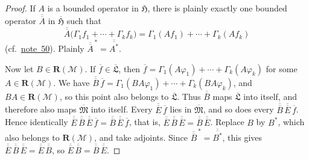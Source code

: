 \documentclass[
  paper=b5,
  twoside=true,
  fontsize=13pt,
  headings=normal,
  bookmarkpackage=false
]{scrartcl}
\theoremstyle{definition}
\newcommand{\NoteRef}[1]{\hyperref[fn:#1]{note~#1}}
\newcommand{\GeneratedRing}{\boldsymbol{R}}
\newcommand{\FrakM}{\mathfrak{M}}
\newcommand{\FrakL}{\mathfrak{L}}
\begin{document}
\begin{proof}
If \(A\) is a bounded operator in \(\mathfrak H\), there is plainly
exactly one bounded operator \(\overline{\overline A}\) in
\(\overline{\mathfrak H}\) such that
\[
  \overline{\overline A}\bigl(\Gamma_1f_1+\cdots+\Gamma_kf_k\bigr)
  =\Gamma_1(Af_1)+\cdots+\Gamma_k(Af_k)
\]
(cf.\ \NoteRef{50}). Plainly
\(\overline{\overline A}^{\,*}=\overline{\overline{A^*}}\).

Now let \(B\in \GeneratedRing (\mathcal M)\). If \(\overline f\in\overline{\FrakL}\),
then \(\overline f=\Gamma_1(A\varphi_1)+\cdots+\Gamma_k(A\varphi_k)\)
for some \(A\in \GeneratedRing (\mathcal M)\). We have
\(\overline{\overline B}\,\overline f
 =\Gamma_1(BA\varphi_1)+\cdots+\Gamma_k(BA\varphi_k)\), and
\(BA\in \GeneratedRing (\mathcal M)\), so this point also belongs to \(\overline{\FrakL}\).
Thus \(\overline{\overline B}\) maps \(\overline{\FrakL}\) into itself,
and therefore also maps \(\overline{\FrakM}\) into itself.
Every \(\overline{\overline E}\,\overline f\) lies in \(\overline{\FrakM}\),
and so does every \(\overline{\overline B}\,\overline{\overline E}\,\overline f\).
Hence identically
\(\overline{\overline E}\,\overline{\overline B}\,\overline{\overline E}\,\overline f
 =\overline{\overline B}\,\overline{\overline E}\,\overline f\), that is,
\(\overline{\overline E}\,\overline{\overline B}\,\overline{\overline E}
 =\overline{\overline B}\,\overline{\overline E}\).
Replace \(B\) by \(B^*\), which also belongs to \(\GeneratedRing (\mathcal M)\), and
take adjoints. Since
\(\overline{\overline B}^{\,*}=\overline{\overline{B^*}}\),
this gives
\(\overline{\overline E}\,\overline{\overline B}\,\overline{\overline E}
 =\overline{\overline E}\,\overline{\overline B}\), so
\(\overline{\overline E}\,\overline{\overline B}
 =\overline{\overline B}\,\overline{\overline E}\).


\end{proof}
\end{document}
